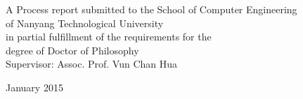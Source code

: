 \documentclass[12pt,a4paper]{report}
\begin{document}
\begin{center}
A Process report submitted to the School of Computer Engineering \\
of Nanyang Technological University\\
\vspace{0.2cm}
in partial fulfillment of the requirements for the\\
degree of Doctor of Philosophy \\
\vspace{0.6cm} Supervisor: Assoc. Prof. Vun Chan Hua\\
\vspace{0.6cm}

January 2015
\end{center}
\normalsize
\newpage
\mbox{}
\newpage
\newpage
\Large
\end{document}
